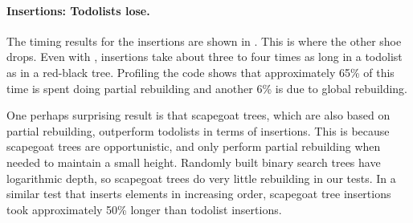 \documentclass{patmorin}
\begin{document}
\paragraph{Insertions: Todolists lose.}
The timing results for the insertions are shown in
. This is where the other shoe drops.  Even with
, insertions take about three to four times as long in
a todolist as in a red-black tree.  Profiling the code shows that
approximately 65\% of this time is spent doing partial rebuilding and
another 6\% is due to global rebuilding.

One perhaps surprising result is that scapegoat trees, which are also
based on partial rebuilding, outperform todolists in terms of insertions.
This is because scapegoat trees are opportunistic, and only perform
partial rebuilding when needed to maintain a small height.  Randomly built
binary search trees have logarithmic depth, so scapegoat trees do very
little rebuilding in our tests.  In a similar test that inserts elements
in increasing order, scapegoat tree insertions took approximately 50\%
longer than todolist insertions.
\end{document}
